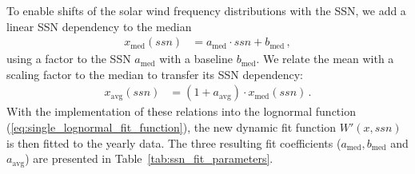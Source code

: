 To enable shifts of the solar wind frequency distributions with the SSN, we add a linear SSN dependency to the median
\begin{align}
	x_\text{med}(ssn) &= a_\text{med} \cdot ssn + b_\text{med}\,,	\label{eq:median_with_ssn}
\end{align}
using a factor to the SSN $a_\text{med}$ with a baseline $b_\text{med}$. We relate the mean with a scaling factor to the median to transfer its SSN dependency:
\begin{align}
	x_\text{avg}(ssn) &= (1 + a_\text{avg}) \cdot x_\text{med}(ssn)\,.	\label{eq:mean_with_ssn}
\end{align}
With the implementation of these relations into the lognormal function (\ref{eq:single_lognormal_fit_function}), the new dynamic fit function $W'(x,ssn)$ is then fitted to the yearly data. The three resulting fit coefficients ($a_\text{med}, b_\text{med}$ and $a_\text{avg}$) are presented in Table~\ref{tab:ssn_fit_parameters}.
